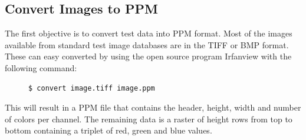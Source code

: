 \documentclass[12pt]{article}
\begin{document}
\subsection{Convert Images to PPM}
The first objective is to convert test data into PPM format. Most of the images available from standard test image databases are in the TIFF or BMP format. These can easy converted by using the open source program Irfanview with the following command:

\begin{center}
\begin{figure}[!htbp]
\begin{verbatim}
$ convert image.tiff image.ppm
\end{verbatim}
\end{figure}
\end{center}

This will result in a PPM file that contains the header, height, width and number of colors per channel. The remaining data is a raster of height rows from top to bottom containing a triplet of red, green and blue values.
\end{document}

